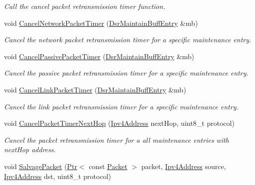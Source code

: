 \begin{DoxyCompactItemize}
\begin{DoxyCompactList}\small\item\em Call the cancel packet retransmission timer function. \end{DoxyCompactList}\item 
void \hyperlink{classns3_1_1dsr_1_1DsrRouting_aeed35bcacf68c9f349078b508e73c9aa}{Cancel\+Network\+Packet\+Timer} (\hyperlink{classns3_1_1dsr_1_1DsrMaintainBuffEntry}{Dsr\+Maintain\+Buff\+Entry} \&mb)
\begin{DoxyCompactList}\small\item\em Cancel the network packet retransmission timer for a specific maintenance entry. \end{DoxyCompactList}\item 
void \hyperlink{classns3_1_1dsr_1_1DsrRouting_aee6495417f54a12f484029ee1a445d64}{Cancel\+Passive\+Packet\+Timer} (\hyperlink{classns3_1_1dsr_1_1DsrMaintainBuffEntry}{Dsr\+Maintain\+Buff\+Entry} \&mb)
\begin{DoxyCompactList}\small\item\em Cancel the passive packet retransmission timer for a specific maintenance entry. \end{DoxyCompactList}\item 
void \hyperlink{classns3_1_1dsr_1_1DsrRouting_a3d5aef30dc62293cdc487b7110be2324}{Cancel\+Link\+Packet\+Timer} (\hyperlink{classns3_1_1dsr_1_1DsrMaintainBuffEntry}{Dsr\+Maintain\+Buff\+Entry} \&mb)
\begin{DoxyCompactList}\small\item\em Cancel the link packet retransmission timer for a specific maintenance entry. \end{DoxyCompactList}\item 
void \hyperlink{classns3_1_1dsr_1_1DsrRouting_a215e6fcab10ee0d744a657f0af2695c6}{Cancel\+Packet\+Timer\+Next\+Hop} (\hyperlink{classns3_1_1Ipv4Address}{Ipv4\+Address} next\+Hop, uint8\+\_\+t protocol)
\begin{DoxyCompactList}\small\item\em Cancel the packet retransmission timer for a all maintenance entries with next\+Hop address. \end{DoxyCompactList}\item 
void \hyperlink{classns3_1_1dsr_1_1DsrRouting_a83dd51056e4e48ad538ff41fda129272}{Salvage\+Packet} (\hyperlink{classns3_1_1Ptr}{Ptr}$<$ const \hyperlink{classns3_1_1Packet}{Packet} $>$ packet, \hyperlink{classns3_1_1Ipv4Address}{Ipv4\+Address} source, \hyperlink{classns3_1_1Ipv4Address}{Ipv4\+Address} dst, uint8\+\_\+t protocol)

\end{DoxyCompactItemize}
